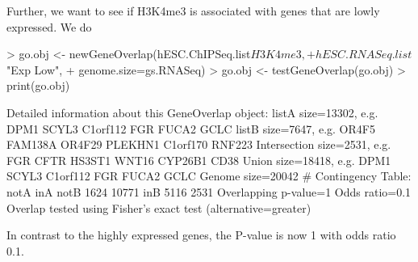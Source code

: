 \documentclass{article}
\begin{document}
Further, we want to see if H3K4me3 is associated with genes that are lowly expressed. We do
\begin{Schunk}
\begin{Sinput}
> go.obj <- newGeneOverlap(hESC.ChIPSeq.list$H3K4me3, 
+                          hESC.RNASeq.list$"Exp Low", 
+                          genome.size=gs.RNASeq)
> go.obj <- testGeneOverlap(go.obj)
> print(go.obj)
\end{Sinput}
\begin{Soutput}
Detailed information about this GeneOverlap object:
listA size=13302, e.g. DPM1 SCYL3 C1orf112 FGR FUCA2 GCLC
listB size=7647, e.g. OR4F5 FAM138A OR4F29 PLEKHN1 C1orf170 RNF223
Intersection size=2531, e.g. FGR CFTR HS3ST1 WNT16 CYP26B1 CD38
Union size=18418, e.g. DPM1 SCYL3 C1orf112 FGR FUCA2 GCLC
Genome size=20042
# Contingency Table:
     notA   inA
notB 1624 10771
inB  5116  2531
Overlapping p-value=1
Odds ratio=0.1
Overlap tested using Fisher's exact test (alternative=greater)
\end{Soutput}
\end{Schunk}
In contrast to the highly expressed genes, the P-value is now 1 with odds ratio 0.1. 
\end{document}

